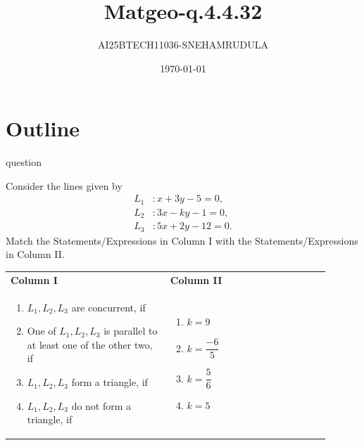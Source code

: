 \documentclass{beamer}
\title{Matgeo-q.4.4.32}
\author{AI25BTECH11036-SNEHAMRUDULA}
\date{\today}
\begin{document}
\begin{frame}
\titlepage
\end{frame}

\section*{Outline}
\begin{frame}{question}
   \begin{question}
Consider the lines given by
\begin{align*}
L_1 &: x + 3y - 5 = 0, \\
L_2 &: 3x - ky - 1 = 0, \\
L_3 &: 5x + 2y - 12 = 0.
\end{align*}
Match the Statements/Expressions in Column I with the Statements/Expressions in Column II.

\begin{center}
\begin{tabular}{p{0.45\linewidth} p{0.45\linewidth}}
\textbf{Column I} & \textbf{Column II} \\
\begin{enumerate}[label=(\Alph*)]
    \item $L_1, L_2, L_3$ are concurrent, if
    \item One of $L_1, L_2, L_3$ is parallel to at least one of the other two, if
    \item $L_1, L_2, L_3$ form a triangle, if
    \item $L_1, L_2, L_3$ do not form a triangle, if
\end{enumerate}
&
\begin{enumerate}[label=(\alph*)]
    \item $k = 9$
    \item $k = \dfrac{-6}{5}$
    \item $k = \dfrac{5}{6}$
    \item $k = 5$
\end{enumerate}
\end{tabular}
\end{center}
\end{question}
\end{frame}
\end{document}
